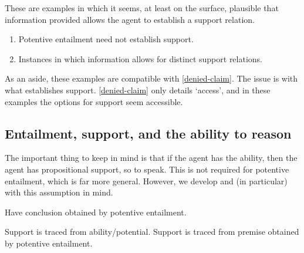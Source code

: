 \begin{note}
  These are examples in which it seems, at least on the surface, plausible that information provided allows the agent to establish a support relation.
\end{note}

\begin{note}
  \begin{enumerate}
  \item Potentive entailment need not establish support.
  \item Instances in which information allows for distinct support relations.
  \end{enumerate}
\end{note}

\begin{note}
  As an aside, these examples are compatible with \ref{denied-claim}.
  The issue is with what establishes support.
  \ref{denied-claim} only details `access', and in these examples the options for support seem accessible.
\end{note}

\subsection{Entailment, support, and the ability to reason}
\label{sec:enta-supp-abil}

\begin{note}
  The important thing to keep in mind is that if the agent has the ability, then the agent has propositional support, so to speak.
  This is not required for potentive entailment, which is far more general.
  However, we develop \AR{} and (in particular) \WR{} with this assumption in mind.
\end{note}

\begin{note}[\AR{} and \WR{}]
  Have conclusion obtained by potentive entailment.

  Support is traced from ability/potential.
  Support is traced from premise obtained by potentive entailment.
\end{note}

